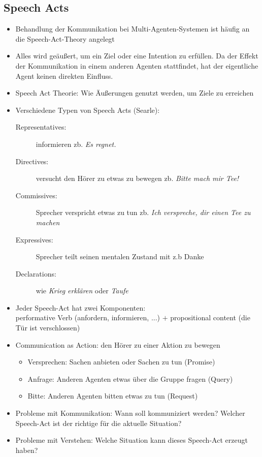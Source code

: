 \documentclass{article} %
\begin{document}
	\subsection{Speech Acts}
	\begin{itemize}
		\item Behandlung der Kommunikation bei Multi-Agenten-Systemen ist häufig an die Speech-Act-Theory angelegt
		\item Alles wird geäußert, um ein Ziel oder eine Intention zu erfüllen. Da der Effekt der Kommunikation in einem anderen Agenten stattfindet, hat der eigentliche Agent keinen direkten Einfluss.
		\item Speech Act Theorie: Wie Äußerungen genutzt werden, um Ziele zu erreichen
		\item Verschiedene Typen von Speech Acts (Searle):
		\begin{description}
			\item [Representatives:] informieren zb. \emph{Es regnet.}
			\item [Directives:] versucht den Hörer zu etwas zu bewegen zb. \emph{Bitte mach mir Tee!}
			\item [Commissives:] Sprecher verspricht etwas zu tun zb. \emph{Ich verspreche, dir einen Tee zu machen}
			\item [Expressives:] Sprecher teilt seinen mentalen Zustand mit z.b Danke
			\item [Declarations:] wie \emph{Krieg erklären} oder \emph{Taufe}
		\end{description}
		\item Jeder Speech-Act hat zwei Komponenten: \\
		performative Verb (anfordern, informieren, ...) $+$ propositional content (die Tür ist verschlossen)
		\item Communication as Action: den Hörer zu einer Aktion zu bewegen
		\begin{itemize}
			\item Versprechen: Sachen anbieten oder Sachen zu tun (Promise)
			\item Anfrage: Anderen Agenten etwas über die Gruppe fragen (Query)
			\item Bitte: Anderen Agenten bitten etwas zu tun (Request)
		\end{itemize}
		\item Probleme mit Kommunikation: Wann soll kommuniziert werden? Welcher Speech-Act ist der richtige für die aktuelle Situation? 
		\item Probleme mit Verstehen: Welche Situation kann dieses Speech-Act erzeugt haben?

\end{itemize}
\end{document}
